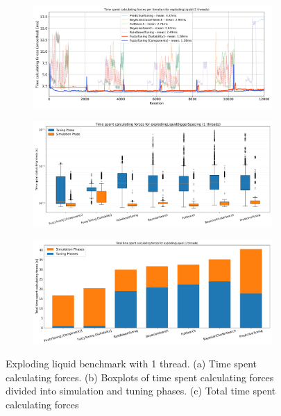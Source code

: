 \begin{figure}[h]
    \centering

    \begin{subfigure}[c]{\textwidth}
        \includegraphics[width=\columnwidth,trim={0cm 0 0cm 0.9cm},clip]{figures/Benchmark/ExplodingLiquid/timing_explodingLiquid_1.png}
        \caption{}
        \label{fig:explodingTimings_1thread}
    \end{subfigure}


    \begin{subfigure}[c]{\textwidth}
        \includegraphics[width=\columnwidth,trim={0cm 0 0cm 1cm},clip]{figures/Benchmark/ExplodingLiquid/boxplot_explodingLiquid_1.png}
        \caption{}
        \label{fig:explodingLiquidBoxplot_1thread}
    \end{subfigure}

    \begin{subfigure}[b]{\textwidth}
        \includegraphics[width=\columnwidth,trim={0cm 0 0cm 0.9cm},clip]{figures/Benchmark/ExplodingLiquid/total_time_explodingLiquid_1.png}
        \caption{}
        \label{fig:explodingLiquidTotalTime_1thread}
    \end{subfigure}


    \caption[Exploding liquid benchmark with 1 thread]{Exploding liquid benchmark with 1 thread. (a) Time spent calculating forces. (b) Boxplots of time spent calculating forces divided into simulation and tuning phases. (c) Total time spent calculating forces}
    \label{fig:explodingLiquid_1thread}
\end{figure}


